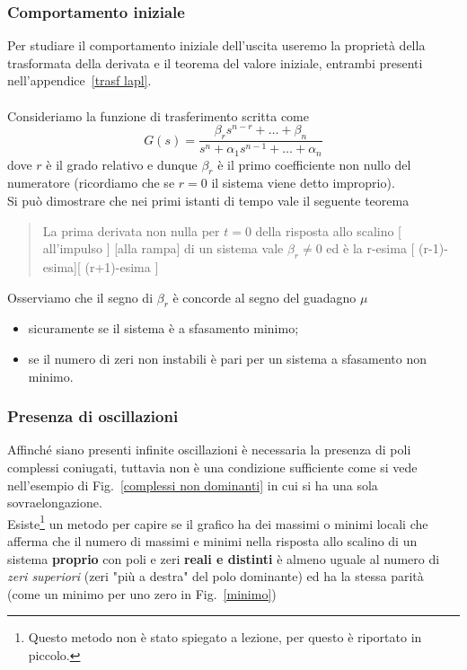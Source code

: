 \documentclass[a4paper]{article}
\begin{document}
	\subsubsection{Comportamento iniziale}
	Per studiare il comportamento iniziale dell'uscita useremo la proprietà della trasformata della derivata e il teorema del valore iniziale, entrambi presenti nell'appendice~\ref{trasf lapl}.
	\\\\Consideriamo la funzione di trasferimento scritta come \[G(s)=\dfrac{\beta_rs^{n-r}+\dots+\beta_n}{s^n+\alpha_1s^{n-1}+\dots+\alpha_n}\]
	dove $r$ è il grado relativo e dunque $\beta_r$ è il primo coefficiente non nullo del numeratore (ricordiamo che se $r=0$ il sistema viene detto improprio).
	\\Si può dimostrare che nei primi istanti di tempo vale il seguente teorema 
	\begin{quote}
		La prima derivata non nulla per $t=0$ della risposta allo scalino [\color{red} all'impulso \color{black}] [\color{cyan}alla rampa\color{black}] di un sistema vale $\beta_r\ne0$ ed è la r-esima [\color{red} (r-1)-esima\color{black}][\color{cyan} (r+1)-esima \color{black}]
	\end{quote}
	Osserviamo che il segno di $\beta_r$ è concorde al segno del guadagno $\mu$
	\begin{itemize}
		\item sicuramente se il sistema è a sfasamento minimo;
		\item se il numero di zeri non instabili è pari per un sistema a sfasamento non minimo.
	\end{itemize}
	\subsubsection{Presenza di oscillazioni}
	Affinché siano presenti infinite oscillazioni è necessaria la presenza di poli complessi coniugati, tuttavia non è una condizione sufficiente come si vede nell'esempio di Fig.~\ref{complessi non dominanti} in cui si ha una sola sovraelongazione. 
	\\{\footnotesize Esiste\footnote{Questo metodo non è stato spiegato a lezione, per questo è riportato in piccolo.} un metodo per capire se il grafico ha dei massimi o minimi locali che afferma che il numero di massimi e minimi nella risposta allo scalino di un sistema \textbf{proprio} con poli e zeri \textbf{reali e distinti} è almeno uguale al numero di \emph{zeri superiori} (zeri "più a destra" del polo dominante) ed ha la stessa parità (come un minimo per uno zero in Fig.~\ref{minimo})  }	
	
\end{document}
